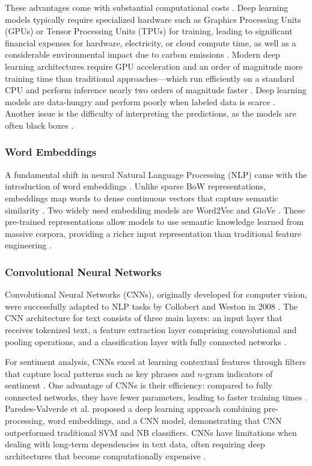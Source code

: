\documentclass[a4paper,twoside,12pt]{book}
\begin{document}
These advantages come with substantial computational costs \cite{strubell2019energy}. Deep learning models typically require specialized hardware such as Graphics Processing Units (GPUs) or Tensor Processing Units (TPUs) for training, leading to significant financial expenses for hardware, electricity, or cloud compute time, as well as a considerable environmental impact due to carbon emissions \cite{strubell2019energy}. Modern deep learning architectures require GPU acceleration and an order of magnitude more training time than traditional approaches---which run efficiently on a standard CPU and perform inference nearly two orders of magnitude faster \cite{mulianingrum2025comparative}. Deep learning models are data-hungry and perform poorly when labeled data is scarce \cite{Li2017deep}. Another issue is the difficulty of interpreting the predictions, as the models are often black boxes \cite{Li2017deep}.

\subsubsection{Word Embeddings}

A fundamental shift in neural Natural Language Processing (NLP) came with the introduction of word embeddings \cite{DeSantis2023prototype}. Unlike sparse BoW representations, embeddings map words to dense continuous vectors that capture semantic similarity \cite{DeSantis2023prototype}. Two widely used embedding models are Word2Vec and GloVe \cite{DeSantis2023prototype, pennington2014glove}. These pre-trained representations allow models to use semantic knowledge learned from massive corpora, providing a richer input representation than traditional feature engineering \cite{behdenna2018document, DeSantis2023prototype, sharma2025review}.

\subsubsection{Convolutional Neural Networks}
Convolutional Neural Networks (CNNs), originally developed for computer vision, were successfully adapted to NLP tasks by Collobert and Weston in 2008 \cite{Collobert2008unified}. The CNN architecture for text consists of three main layers: an input layer that receives tokenized text, a feature extraction layer comprising convolutional and pooling operations, and a classification layer with fully connected networks \cite{Collobert2008unified}.

For sentiment analysis, CNNs excel at learning contextual features through filters that capture local patterns such as key phrases and $n$-gram indicators of sentiment \cite{sharma2025review}. One advantage of CNNs is their efficiency: compared to fully connected networks, they have fewer parameters, leading to faster training times \cite{sharma2025review}. Paredes-Valverde et al. \cite{Paredes2017sentiment} proposed a deep learning approach combining pre-processing, word embeddings, and a CNN model, demonstrating that CNN outperformed traditional SVM and NB classifiers. CNNs have limitations when dealing with long-term dependencies in text data, often requiring deep architectures that become computationally expensive \cite{sharma2025review}.
\end{document}
